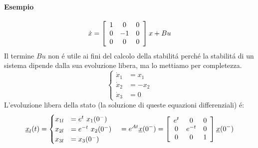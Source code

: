 \documentclass[../main.tex]{subfiles}
\begin{document}
		\begin{mdframed}[style=Esempio]
			\paragraph{Esempio}
			\[
				\dot x = \left[ \begin{array}{ccc} 1 & 0 & 0\\ 0 & -1 & 0\\ 0 & 0 & 0 \end{array} \right] x + Bu
			\]
			Il termine $ Bu $ non \'e utile ai fini del calcolo della stabilit\'a perch\'e la stabilit\'a di un sistema dipende dalla sua evoluzione libera, ma lo mettiamo per completezza.
			\[ 
				\begin{cases}
					\dot x_1 &= x_1\\
					\dot x_2 &= -x_2\\
					\dot x_3 &= 0
				\end{cases}
			\]
			L'evoluzione libera della stato (la soluzione di queste equazioni differenziali) \'e:
			\[ 
				\underline x_l(t) = 
				\begin{cases}
					x_{1l} &= e^t\ x_1(0^-)\\
					x_{2l} &= e^{-t}\ x_2(0^-)\\
					x_{3l} &= x_3(0^-)
				\end{cases}
				\quad = e^{At} \underline x(0^-) = \left[ \begin{array}{ccc} e^t & 0 & 0\\ 0 & e^{-t} & 0\\ 0 & 0 & 1 \end{array} \right] \underline x(0^-)
			\]
			  

\end{mdframed}
\end{document}
